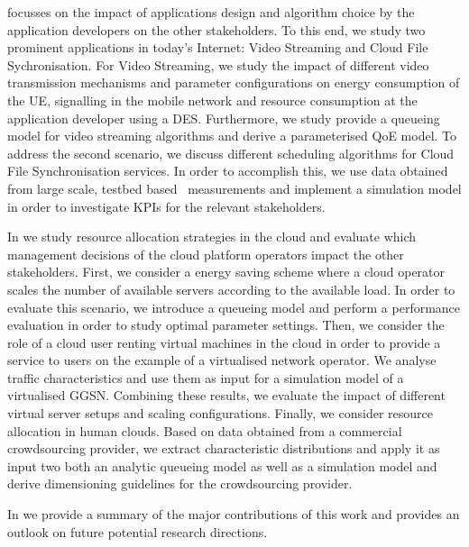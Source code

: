  focusses on the impact of applications design and algorithm choice by the application developers on the other stakeholders.
To this end, we study two prominent applications in today's Internet: Video Streaming and Cloud File Sychronisation.
For Video Streaming, we study the impact of different video transmission mechanisms and parameter configurations on energy consumption of the \gls{UE}, signalling in the mobile network and resource consumption at the application developer using a \gls{DES}.
Furthermore, we study provide a queueing model for video streaming algorithms and derive a parameterised \gls{QoE} model.
To address the second scenario, we discuss different scheduling algorithms for Cloud File Synchronisation services.
In order to accomplish this, we use data obtained from large scale, testbed based~\cite{Chun2003} measurements and implement a simulation model in order to investigate \glspl{KPI} for the relevant stakeholders.  

In  we study resource allocation strategies in the cloud and evaluate which management decisions of the cloud platform operators impact the other stakeholders.
First, we consider a energy saving scheme where a cloud operator scales the number of available servers according to the available load.
In order to evaluate this scenario, we introduce a queueing model and perform a performance evaluation in order to study optimal parameter settings.
Then, we consider the role of a cloud user renting virtual machines in the cloud in order to provide a service to users on the example of a virtualised network operator.
We analyse traffic characteristics and use them as input for a simulation model of a virtualised \gls{GGSN}.
Combining these results, we evaluate the impact of different virtual server setups and scaling configurations.
Finally, we consider resource allocation in human clouds.
Based on data obtained from a commercial crowdsourcing provider, we extract characteristic distributions and apply it as input two both an analytic queueing model as well as a simulation model and derive dimensioning guidelines for the crowdsourcing provider.

In  we provide a summary of the major contributions of this work and provides an outlook on future potential research directions.